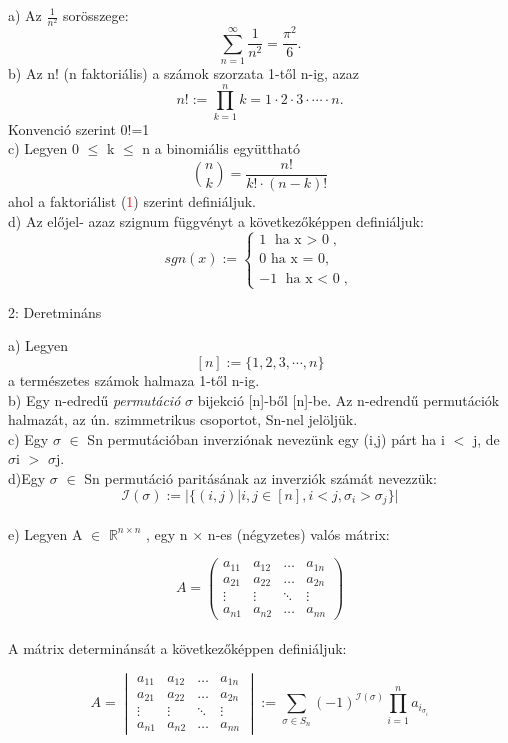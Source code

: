 \documentclass{article}
\begin{document}
a) Az $\frac{1}{n^2}$ sorösszege:
\[
\sum_{n=1}^\infty \frac{1}{n^2}=\frac{\pi^2}{6}.
\]
b) Az n! (n faktoriális) a számok szorzata 1-től n-ig, azaz
\[
n! := \prod_{k=1}^n k=1 \cdot 2 \cdot 3 \cdot \cdots \cdot n.
\]
Konvenció szerint 0!=1
\\
c) Legyen 0 $\leq$ k $\leq$ n a binomiális együttható
\[
\binom{n}{k} = \frac{n!}{k! \cdot (n - k)!}
\]
ahol a faktoriálist (\textcolor{red}{1}) szerint definiáljuk. 
\\
d) Az előjel- azaz szignum függvényt a következőképpen definiáljuk:
\[
sgn(x) := 
\begin{cases}
1 \text{ ha x $>$ 0},\\
0 \text{ ha x = 0} ,\\
-1 \text{ ha x $<$ 0},
\end{cases}
\]

\clearpage
\begin{huge}
2: Deretmináns
\end{huge}

a) Legyen
\[
[n] := \{1, 2, 3, \cdots ,n \}
\]
a természetes számok halmaza 1-től n-ig.\\
b) Egy n-edredű \emph{permutáció} $\sigma$ bijekció [n]-ből [n]-be. Az n-edrendű permutációk halmazát, az ún. szimmetrikus csoportot, Sn-nel jelöljük.\\
c) Egy $\sigma$ $\in$ Sn permutációban inverziónak nevezünk egy (i,j) párt ha i $<$ j, de $\sigma$i $>$ $\sigma$j.\\
d)Egy  $\sigma$ $\in$ Sn permutáció paritásának az inverziók számát nevezzük:
\[
\mathcal{I}(\sigma) := \vert \{(i,j) | i,j \in [n], i<j, \sigma_{i} > \sigma_{j}\} \vert
\]
\\
e) Legyen A $\in$ $\mathbb{R}^{n \times n}$ , egy n $\times$ n-es (négyzetes) valós mátrix:

\[
A=
\begin{pmatrix}
a_{11} & a_{12} & \dots & a_{1n}\\
a_{21} & a_{22} & \dots & a_{2n}\\
\vdots & \vdots & \ddots & \vdots\\
a_{n1} & a_{n2} & \dots & a_{nn}
\end{pmatrix}
\]
\\
A mátrix determinánsát a következőképpen definiáljuk:

\[
A=
\begin{vmatrix}
a_{11} & a_{12} & \dots & a_{1n}\\
a_{21} & a_{22} & \dots & a_{2n}\\
\vdots & \vdots & \ddots & \vdots\\
a_{n1} & a_{n2} & \dots & a_{nn}
\end{vmatrix}
 := \sum_{\sigma \in S_{n}} (-1)^{\mathcal{I}(\sigma)} \prod_{i=1}^n a_{i_{\sigma_{i}}}
\]
\clearpage
\end{document}
